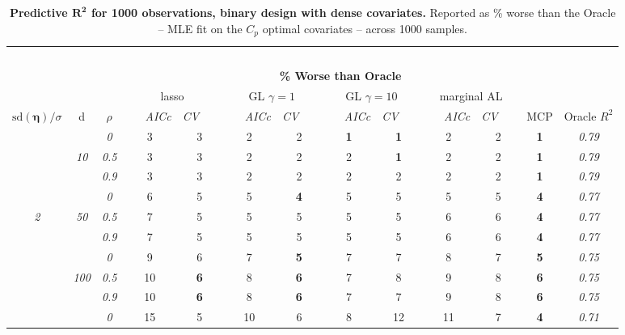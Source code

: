 \begin{table}
\vspace{-.2cm}
\footnotesize
\caption{ 
	{\bf  Predictive $\boldsymbol{R^2}$ for 1000 observations, 
	binary design with dense covariates.}
  Reported as  \% worse than the Oracle 
  -- MLE fit on the $C_p$ optimal covariates -- 
  across 1000 samples.}
\begin{center}
\begin{tabular}{ccc|cc|cc|cc|cc|c|c}
\hline &&&\multicolumn{9}{|c|}{~}\\[-1ex]
\multicolumn{3}{c}{~}&\multicolumn{9}{|c|}{\bf \% Worse than Oracle } &   \\[1ex]
& &
& \multicolumn{2}{c}{lasso} 
& \multicolumn{2}{c}{GL $\gamma=1$} 
& \multicolumn{2}{c}{GL $\gamma=10$} 
& \multicolumn{2}{c}{marginal AL} 
& \multicolumn{1}{c|}{~} & \\[-0.5ex]
$\mathrm{sd}(\boldsymbol{\eta})/\sigma$ & {\sf d} & $\rho$ 
& ~~~\scriptsize\it AICc & \multicolumn{1}{c}{\scriptsize\it CV~~~}
& ~~~\scriptsize\it AICc & \multicolumn{1}{c}{\scriptsize\it CV~~~}
& ~~~\scriptsize\it AICc & \multicolumn{1}{c}{\scriptsize\it CV~~~}
& ~~~\scriptsize\it AICc & \multicolumn{1}{c}{\scriptsize\it CV~~~} 
& \multicolumn{1}{c|}{ MCP} & Oracle $R^2$ \\[.5ex]
\hline\rule{0pt}{3ex}
& & \it  0  & 3 & 3 & 2 & 2 & {\bf 1} & {\bf 1} & 2 & 2 & {\bf 1} & \it  0.79 \\
 & \it  10  & \it  0.5  & 3 & 3 & 2 & 2 & 2 & {\bf 1} & 2 & 2 & {\bf 1} & \it  0.79 \\
& & \it  0.9  & 3 & 3 & 2 & 2 & 2 & 2 & 2 & 2 & {\bf 1} & \it  0.79 \\[1ex]
\cline{2-3}\rule{0pt}{3ex}
& & \it  0  & 6 & 5 & 5 & {\bf 4} & 5 & 5 & 5 & 5 & {\bf 4} & \it  0.77 \\
\it  2  & \it  50  & \it  0.5  & 7 & 5 & 5 & 5 & 5 & 5 & 6 & 6 & {\bf 4} & \it  0.77 \\
& & \it  0.9  & 7 & 5 & 5 & 5 & 5 & 5 & 6 & 6 & {\bf 4} & \it  0.77 \\[1ex]
\cline{2-3}\rule{0pt}{3ex}
& & \it  0  & 9 & 6 & 7 & {\bf 5} & 7 & 7 & 8 & 7 & {\bf 5} & \it  0.75 \\
 & \it  100  & \it  0.5  & 10 & {\bf 6} & 8 & {\bf 6} & 7 & 8 & 9 & 8 & {\bf 6} & \it  0.75 \\
& & \it  0.9  & 10 & {\bf 6} & 8 & {\bf 6} & 7 & 7 & 9 & 8 & {\bf 6} & \it  0.75 \\[1ex]
\cline{2-3}\rule{0pt}{3ex}
& & \it  0  & 15 & 5 & 10 & 6 & 8 & 12 & 11 & 7 & {\bf 4} & \it  0.71 \\

\end{tabular}
\end{center}
\end{table}
